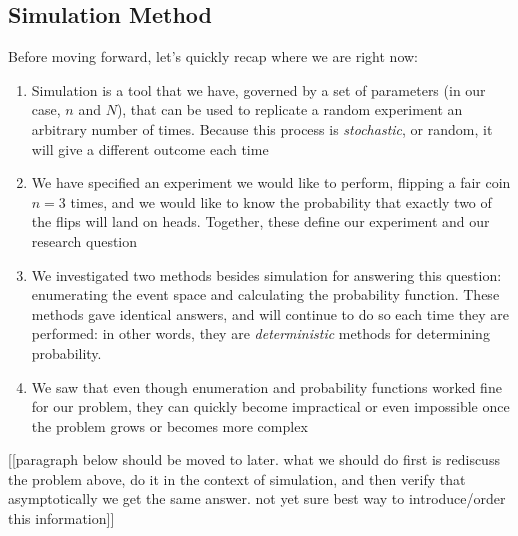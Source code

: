 \documentclass[
]{book}
\theoremstyle{definition}
\theoremstyle{definition}
\theoremstyle{definition}
\theoremstyle{remark}
\begin{document}
\hypertarget{simulation-method}{%
\subsection{Simulation Method}\label{simulation-method}}

Before moving forward, let's quickly recap where we are right now:

\begin{enumerate}
\def\labelenumi{\arabic{enumi}.}
\item
  Simulation is a tool that we have, governed by a set of parameters (in our case, \(n\) and \(N\)), that can be used to replicate a random experiment an arbitrary number of times. Because this process is \emph{stochastic}, or random, it will give a different outcome each time
\item
  We have specified an experiment we would like to perform, flipping a fair coin \(n = 3\) times, and we would like to know the probability that exactly two of the flips will land on heads. Together, these define our experiment and our research question
\item
  We investigated two methods besides simulation for answering this question: enumerating the event space and calculating the probability function. These methods gave identical answers, and will continue to do so each time they are performed: in other words, they are \emph{deterministic} methods for determining probability.
\item
  We saw that even though enumeration and probability functions worked fine for our problem, they can quickly become impractical or even impossible once the problem grows or becomes more complex
\end{enumerate}

{[}{[}paragraph below should be moved to later. what we should do first is rediscuss the problem above, do it in the context of simulation, and then verify that asymptotically we get the same answer. not yet sure best way to introduce/order this information{]}{]}
\end{document}
